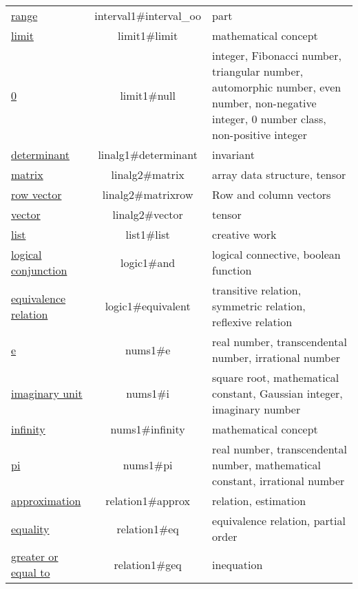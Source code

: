 \documentclass[a4paper]{article}
\begin{document}
\begin{table}[p]
\begin{tabular}{p{.23\linewidth}cp{.5\linewidth}}
\href{https://www.wikidata.org/entity/Q40548497}{range} & interval1\#interval\_oo & part \\
\href{https://www.wikidata.org/entity/Q177239}{limit} & limit1\#limit & mathematical concept \\
\href{https://www.wikidata.org/entity/Q204}{0} & limit1\#null & integer, Fibonacci number, triangular number, automorphic number, even number, non-negative integer, 0 number class, non-positive integer \\
\href{https://www.wikidata.org/entity/Q178546}{determinant} & linalg1\#determinant & invariant \\
\href{https://www.wikidata.org/entity/Q44337}{matrix} & linalg2\#matrix & array data structure, tensor \\
\href{https://www.wikidata.org/entity/Q2916003}{row vector} & linalg2\#matrixrow & Row and column vectors \\
\href{https://www.wikidata.org/entity/Q13471665}{vector} & linalg2\#vector & tensor \\
\href{https://www.wikidata.org/entity/Q12139612}{list} & list1\#list & creative work \\
\href{https://www.wikidata.org/entity/Q191081}{logical conjunction} & logic1\#and & logical connective, boolean function \\
\href{https://www.wikidata.org/entity/Q130998}{equivalence relation} & logic1\#equivalent & transitive relation, symmetric relation, reflexive relation \\
\href{https://www.wikidata.org/entity/Q82435}{e} & nums1\#e & real number, transcendental number, irrational number \\
\href{https://www.wikidata.org/entity/Q193796}{imaginary unit} & nums1\#i & square root, mathematical constant, Gaussian integer, imaginary number \\
\href{https://www.wikidata.org/entity/Q205}{infinity} & nums1\#infinity & mathematical concept \\
\href{https://www.wikidata.org/entity/Q167}{pi} & nums1\#pi & real number, transcendental number, mathematical constant, irrational number \\
\href{https://www.wikidata.org/entity/Q27058}{approximation} & relation1\#approx & relation, estimation \\
\href{https://www.wikidata.org/entity/Q842346}{equality} & relation1\#eq & equivalence relation, partial order \\
\href{https://www.wikidata.org/entity/Q55935291}{greater or equal to} & relation1\#geq & inequation \\

\end{tabular}
\end{table}
\end{document}
